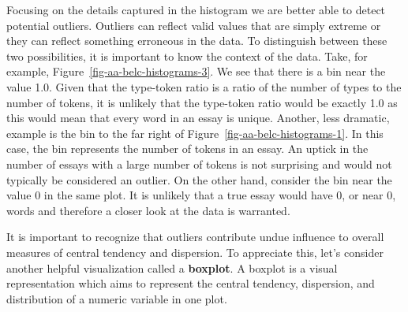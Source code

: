 \documentclass[
  letterpaper,
]{latex/krantz}
\theoremstyle{definition}
\theoremstyle{remark}
\begin{document}
Focusing on the details captured in the histogram we are better able to
detect potential outliers. Outliers can reflect valid values that are
simply extreme or they can reflect something erroneous in the data. To
distinguish between these two possibilities, it is important to know the
context of the data. Take, for example,
Figure~\ref{fig-aa-belc-histograms-3}. We see that there is a bin near
the value 1.0. Given that the type-token ratio is a ratio of the number
of types to the number of tokens, it is unlikely that the type-token
ratio would be exactly 1.0 as this would mean that every word in an
essay is unique. Another, less dramatic, example is the bin to the far
right of Figure~\ref{fig-aa-belc-histograms-1}. In this case, the bin
represents the number of tokens in an essay. An uptick in the number of
essays with a large number of tokens is not surprising and would not
typically be considered an outlier. On the other hand, consider the bin
near the value 0 in the same plot. It is unlikely that a true essay
would have 0, or near 0, words and therefore a closer look at the data
is warranted.

It is important to recognize that outliers contribute undue influence to
overall measures of central tendency and dispersion. To appreciate this,
let's consider another helpful visualization called a \textbf{boxplot}.
A boxplot is a visual representation which aims to represent the central
tendency, dispersion, and distribution of a numeric variable in one
plot.
\end{document}
